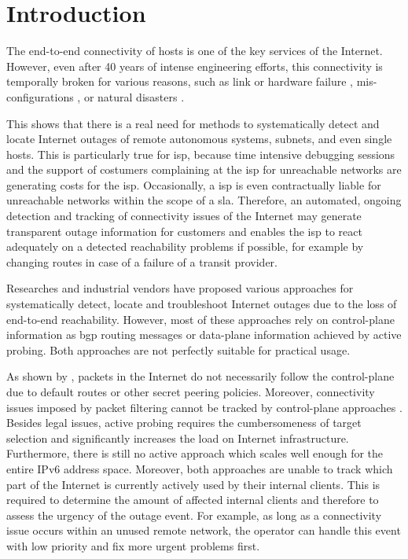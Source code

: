 \chapter{Introduction\label{Introduction}}

The end-to-end connectivity of hosts is one of the key services of the Internet.
However, even after 40 years of intense engineering efforts, this connectivity
is temporally broken for various reasons, such as link or hardware failure
\citep{Markopoulou:2008}, mis-configurations \citep{Mahajan:2002}, or natural
disasters \citep{Dainotti:2012:EBH,Schulman:2011}.

This shows that there is a real need for methods to systematically detect and
locate Internet outages of remote autonomous systems, subnets, and even single
hosts. This is particularly true for \gls{isp}, because time intensive debugging 
sessions and the support of costumers complaining at the \gls{isp} for 
unreachable networks are generating costs for the \gls{isp}. Occasionally, a 
\gls{isp} is even contractually liable for unreachable networks within the 
scope of a \gls{sla}. Therefore, an automated, ongoing detection and tracking of 
connectivity issues of the Internet may generate transparent outage information 
for customers and enables the \gls{isp} to react adequately on a detected 
reachability problems if possible, for example by changing routes in case of a 
failure of a transit provider. 

Researches and industrial vendors have proposed various approaches for
systematically detect, locate and troubleshoot Internet outages due to the loss 
of end-to-end reachability.
However, most of these approaches rely on \gls{control-plane} information as 
\gls{bgp} routing messages or \gls{data-plane} information achieved by active 
probing. Both approaches are not perfectly suitable for practical usage.

As shown by \citet{Bush:Optometry}, packets in the Internet do not necessarily
follow the \gls{control-plane} due to default routes or other secret peering 
policies. Moreover, connectivity issues imposed by packet filtering cannot be 
tracked by \gls{control-plane} approaches \citep{Dainotti:2011:ACI}. 
Besides legal issues, active probing requires the cumbersomeness of target 
selection and significantly increases the load on Internet infrastructure. 
Furthermore, there is still no active approach which scales well
enough for the entire \gls{IPv6} address space. Moreover, both approaches are 
unable to track which part of the Internet is currently actively used by their 
internal clients. This is required to determine the amount of affected internal 
clients and therefore to assess the urgency of the outage event. For example, as 
long as a connectivity issue occurs within an unused remote network, the 
operator can handle this event with low priority and fix more urgent problems 
first.

